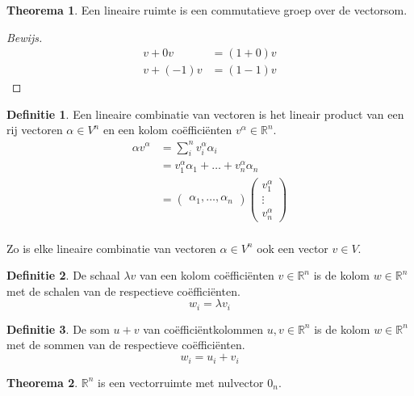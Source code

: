 \documentclass{amsart}
\theoremstyle{definition}
\newtheorem{thm}{Theorema}[section]
\newtheorem{dfn}{Definitie}[section]
\newcommand{\realnums}{\mathbb{R}}
\newcommand{\realn}[1][n]{\realnums^{#1}}
\newenvironment{bewijs}{\begin{proof}[Bewijs]}{\end{proof}}
\begin{document}
\begin{thm}
	Een lineaire ruimte is een commutatieve groep over de vectorsom.
	\begin{bewijs}
		\begin{align*}
			v + 0v    & = (1+0)v \\
			v + (-1)v & = (1-1)v
		\end{align*}
	\end{bewijs}
\end{thm}

\begin{dfn}
	Een lineaire combinatie van vectoren is het lineair product van een rij vectoren $\alpha \in V^n$ en een kolom coëfficiënten $v^\alpha \in \mathbb{R}^n$.
	\begin{align*}
		\alpha v^\alpha & = \sum_i^n v^\alpha_i \alpha_i
		\\
		& = v^\alpha_1 \alpha_1 + \ldots + v^\alpha_n \alpha_n 
		\\
		& =
		\begin{pmatrix}
			\alpha_1, \ldots, \alpha_n
		\end{pmatrix}
		\begin{pmatrix}
			v^\alpha_1 \\
			\vdots       \\
			v^\alpha_n
		\end{pmatrix}
		\\
	\end{align*}
\end{dfn}
Zo is elke lineaire combinatie van vectoren $\alpha \in V^n$ ook een vector $v \in V$.

\begin{dfn}
	De schaal $\lambda v$ van een kolom coëfficiënten $v \in \realn$ is de kolom $w \in \realn$ met de schalen van de respectieve coëfficiënten.
	\begin{equation*}
		{w}_i = \lambda {v}_i
	\end{equation*}
\end{dfn}

\begin{dfn}
	De som $u + v$ van coëfficiëntkolommen $u, v \in \realn$ is de kolom $w \in \realn$ met de sommen van de respectieve coëfficiënten.
	\begin{equation*}
		{w}_i = {u}_i + {v}_i
	\end{equation*}
\end{dfn}

\begin{thm}
	$\realn$ is een vectorruimte met nulvector $0_n$.
\end{thm}
\end{document}
